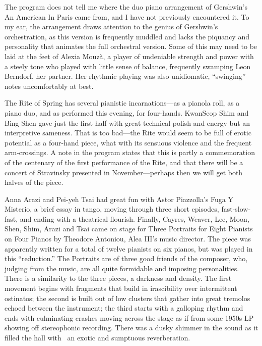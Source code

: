 The program does not tell me where the duo piano arrangement of Gershwin’s An American In Paris came from, and I have not previously encountered it. To my ear, the arrangement draws attention to the genius of Gershwin’s orchestration, as this version is frequently muddled and lacks the piquancy and personality that animates the full orchestral version. Some of this may need to be laid at the feet of Alexia Mouzà, a player of undeniable strength and power with a steely tone who played with little sense of balance, frequently swamping Leon Berndorf, her partner. Her rhythmic playing was also unidiomatic, “swinging” notes uncomfortably at best.

The Rite of Spring has several pianistic incarnations—as a pianola roll, as a piano duo, and as performed this evening, for four-hands. KwanSeop Shim and Bing Shen gave just the first half with great technical polish and energy but an interpretive sameness. That is too bad—the Rite would seem to be full of erotic potential as a four-hand piece, what with its sensuous violence and the frequent arm-crossings. A note in the program states that this is partly a commemoration of the centenary of the first performance of the Rite, and that there will be a concert of Stravinsky presented in November—perhaps then we will get both halves of the piece.

Anna Arazi and Pei-yeh Tsai had great fun with Astor Piazzolla’s Fuga Y Misterio, a brief essay in tango, moving through three short episodes, fast-slow-fast, and ending with a theatrical flourish. Finally, Cayres, Weaver, Lee, Moon, Shen, Shim, Arazi and Tsai came on stage for Three Portraits for Eight Pianists on Four Pianos by Theodore Antoniou, Alea III’s music director. The piece was apparently written for a total of twelve pianists on six pianos, but was played in this “reduction.” The Portraits are of three good friends of the composer, who, judging from the music, are all quite formidable and imposing personalities. There is a similarity to the three pieces, a darkness and density. The first movement begins with fragments that build in irascibility over intermittent ostinatos; the second is built out of low clusters that gather into great tremolos echoed between the instrument; the third starts with a galloping rhythm and ends with culminating crashes moving across the stage as if from some 1950s LP showing off stereophonic recording. There was a dusky shimmer in the sound as it filled the hall with  an exotic and sumptuous reverberation.
